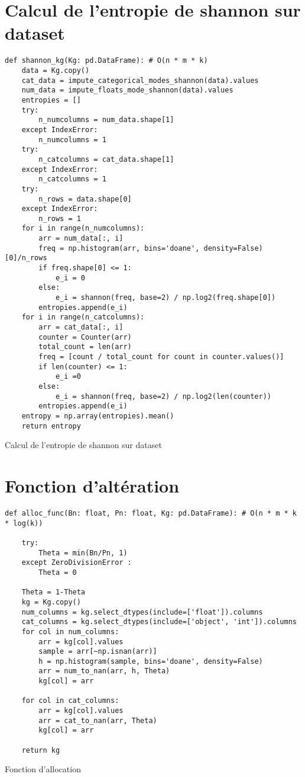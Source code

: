 \section{Calcul de l'entropie de shannon sur dataset} \label{ansec:shannon_compute}
\begin{listing} [H]
\begin{verbatim}
def shannon_kg(Kg: pd.DataFrame): # O(n * m * k)
    data = Kg.copy()
    cat_data = impute_categorical_modes_shannon(data).values
    num_data = impute_floats_mode_shannon(data).values
    entropies = []
    try:
        n_numcolumns = num_data.shape[1]
    except IndexError:
        n_numcolumns = 1
    try:
        n_catcolumns = cat_data.shape[1]
    except IndexError:
        n_catcolumns = 1
    try:
        n_rows = data.shape[0]
    except IndexError:
        n_rows = 1
    for i in range(n_numcolumns):
        arr = num_data[:, i]
        freq = np.histogram(arr, bins='doane', density=False)[0]/n_rows
        if freq.shape[0] <= 1:
            e_i = 0
        else:
            e_i = shannon(freq, base=2) / np.log2(freq.shape[0])
        entropies.append(e_i)
    for i in range(n_catcolumns):
        arr = cat_data[:, i]
        counter = Counter(arr)
        total_count = len(arr)
        freq = [count / total_count for count in counter.values()]
        if len(counter) <= 1:
            e_i =0
        else:
            e_i = shannon(freq, base=2) / np.log2(len(counter))
        entropies.append(e_i)
    entropy = np.array(entropies).mean()
    return entropy
\end{verbatim}
\caption{Calcul de l'entropie de shannon sur dataset}
\label{code:shannon_compute}
\end{listing}

\section{Fonction d'altération} \label{ansec:alloc_compute}
\begin{listing} [H]
\begin{verbatim}
def alloc_func(Bn: float, Pn: float, Kg: pd.DataFrame): # O(n * m * k * log(k))
    
    try:
        Theta = min(Bn/Pn, 1)
    except ZeroDivisionError :
        Theta = 0
    
    Theta = 1-Theta
    kg = Kg.copy()
    num_columns = kg.select_dtypes(include=['float']).columns
    cat_columns = kg.select_dtypes(include=['object', 'int']).columns
    for col in num_columns:
        arr = kg[col].values
        sample = arr[~np.isnan(arr)]
        h = np.histogram(sample, bins='doane', density=False)
        arr = num_to_nan(arr, h, Theta)
        kg[col] = arr

    for col in cat_columns:
        arr = kg[col].values
        arr = cat_to_nan(arr, Theta)
        kg[col] = arr

    return kg
\end{verbatim}
\caption{Fonction d'allocation}
\label{code:alloc_compute]}
\end{listing}

